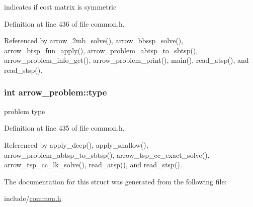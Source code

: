 indicates if cost matrix is symmetric 

Definition at line 436 of file common.h.

Referenced by arrow\_\-2mb\_\-solve(), arrow\_\-bbssp\_\-solve(), arrow\_\-btsp\_\-fun\_\-apply(), arrow\_\-problem\_\-abtsp\_\-to\_\-sbtsp(), arrow\_\-problem\_\-info\_\-get(), arrow\_\-problem\_\-print(), main(), read\_\-atsp(), and read\_\-stsp().\hypertarget{structarrow__problem_42c44f8d75c6e7a1c7440ac472b8594b}{
\subsubsection[{type}]{\setlength{\rightskip}{0pt plus 5cm}int {\bf arrow\_\-problem::type}}}
\label{structarrow__problem_42c44f8d75c6e7a1c7440ac472b8594b}


problem type 

Definition at line 435 of file common.h.

Referenced by apply\_\-deep(), apply\_\-shallow(), arrow\_\-problem\_\-abtsp\_\-to\_\-sbtsp(), arrow\_\-tsp\_\-cc\_\-exact\_\-solve(), arrow\_\-tsp\_\-cc\_\-lk\_\-solve(), read\_\-atsp(), and read\_\-stsp().

The documentation for this struct was generated from the following file:\begin{CompactItemize}
\item 
include/\hyperlink{common_8h}{common.h}\end{CompactItemize}
